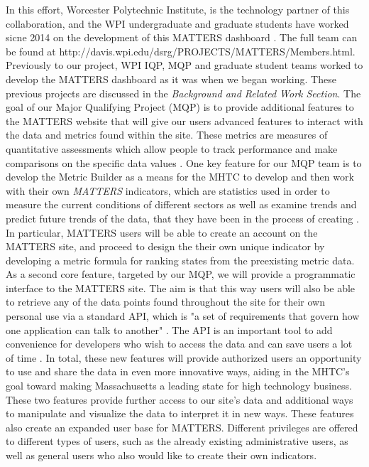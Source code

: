 	In this effort, Worcester Polytechnic Institute, is the technology partner of this collaboration, and the WPI undergraduate and graduate students have worked sicne 2014 on the development of this MATTERS dashboard \cite{wpi}. The full team can be found at http://davis.wpi.edu/dsrg/PROJECTS/MATTERS/Members.html. Previously to our project, WPI IQP, MQP and graduate student teams worked to 
	develop the MATTERS dashboard as it was when we began working. These previous projects are discussed 
	in the \textit{Background and Related Work Section}. The goal of our 
	Major Qualifying Project (MQP) is to provide additional features to the MATTERS 
	website that will give our users advanced features to interact with the data and 
	metrics found within the site. These metrics are measures of quantitative assessments which allow people to track performance and make comparisons on the specific data values \cite{metrics}. One key feature for our MQP team is to develop the Metric Builder 
	as a means for the MHTC to develop and then work with their own 
	\textit{MATTERS} indicators, which are statistics used in order to measure the current conditions of different sectors as well as examine trends and predict future trends of the data, that they have been in the process of creating \cite{indicator}. In particular, MATTERS users will be able to 
	create an account on the MATTERS site, and proceed to design the their own unique indicator by developing a metric formula for ranking states from the preexisting metric data. As a second core feature, targeted by our MQP, we will provide a programmatic interface to the MATTERS site. The aim is that this way users will 
	also be able to retrieve any of the data points found throughout the site 
	for their own personal use via a standard API, which is "a set of requirements that govern how one application can talk to another" \cite{apidef}. The API is an important tool to add convenience for developers who wish to access the data and can save users a lot of time \cite{apidef}. In total, these new 
	features will provide authorized users an opportunity to use and share the 
	data in even more innovative ways, aiding in the MHTC's goal toward making 
	Massachusetts a leading state for high technology business. These two features 
	provide further access to our site's data and additional ways to manipulate and 
	visualize the data to interpret it in new ways. These features also create an 
	expanded user base for MATTERS. Different privileges are offered to different types of 
	users, such as the already existing administrative users, as well as general users who 
	also would like to create their own indicators.